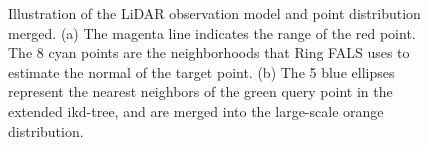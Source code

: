 \documentclass[letterpaper, 10 pt, conference]{ieeeconf}  %
\begin{document}
\begin{figure}[!ht]
{        }
        \caption{Illustration of the LiDAR observation model and point distribution merged.
                (a) The magenta line indicates the range of the red point.
                The 8 cyan points are the neighborhoods that Ring FALS uses to estimate the normal of the target point.
                (b) The 5 blue ellipses represent the nearest neighbors of the green query point in the extended ikd-tree,
                and are merged into the large-scale orange distribution.
        }
\end{figure}
\end{document}
